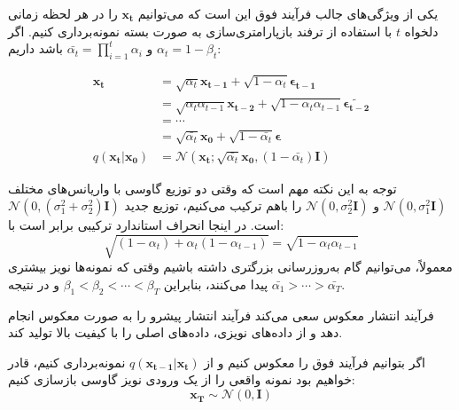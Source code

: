 یکی از ویژگی‌های جالب فرآیند فوق این است که می‌توانیم $\mathbf{x_t}$ را در هر لحظه زمانی دلخواه $t$ با استفاده از ترفند بازپارامتری‌سازی به صورت بسته نمونه‌برداری کنیم. اگر $\alpha_t = 1 - \beta_t$ و $\bar{\alpha_t} = \prod_{i=1}^{t} \alpha_i$ باشد داریم:

\begin{equation}
	\begin{aligned}
		\mathbf{x_t} &= \sqrt{\alpha_t} \mathbf{x_{t-1}} + \sqrt{1 - \alpha_t} \boldsymbol{\epsilon_{t-1}} \\
		&= \sqrt{\alpha_t \alpha_{t-1}} \mathbf{x_{t-2}} + \sqrt{1 - \alpha_t \alpha_{t-1}} \boldsymbol{\tilde{\epsilon_{t-2}}} \\
		&= \cdots \\
		&= \sqrt{\bar{\alpha_t}} \mathbf{x_0} + \sqrt{1 - \bar{\alpha_t}} \boldsymbol{\epsilon} \\
		q(\mathbf{x_t}|\mathbf{x_0}) &= \mathcal{N}(\mathbf{x_t}; \sqrt{\bar{\alpha_t}} \mathbf{x_0}, (1 - \bar{\alpha_t}) \mathbf{I})
	\end{aligned}
\end{equation}

توجه به این نکته مهم است که وقتی دو توزیع گاوسی با واریانس‌های مختلف $\mathcal{N}(0, \sigma_1^2 \mathbf{I})$ و $\mathcal{N}(0, \sigma_2^2 \mathbf{I})$ را باهم ترکیب می‌کنیم، توزیع جدید $\mathcal{N}(0, (\sigma_1^2 + \sigma_2^2) \mathbf{I})$ است. در اینجا انحراف استاندارد ترکیبی برابر است با:
\begin{equation}
	\sqrt{(1 - \alpha_t) + \alpha_t (1 - \alpha_{t-1})} = \sqrt{1 - \alpha_t \alpha_{t-1}}
\end{equation}
معمولاً، می‌توانیم گام به‌روزرسانی بزرگتری داشته باشیم وقتی که نمونه‌ها نویز بیشتری پیدا می‌کنند، بنابراین $\beta_1 < \beta_2 < \cdots < \beta_T$ و در نتیجه $\bar{\alpha_1} > \cdots > \bar{\alpha_T}$.







فرآیند انتشار معکوس سعی می‌کند فرآیند انتشار پیشرو را به صورت معکوس انجام دهد و از داده‌های نویزی، داده‌های اصلی را با کیفیت بالا تولید کند.


اگر بتوانیم فرآیند فوق را معکوس کنیم و از $ q(\mathbf{x_{t-1}}|\mathbf{x_t}) $ نمونه‌برداری کنیم، قادر خواهیم بود نمونه واقعی را از یک ورودی نویز گاوسی بازسازی کنیم:
\begin{equation}
	\mathbf{x_T} \sim \mathcal{N}(0, \mathbf{I})
\end{equation}

